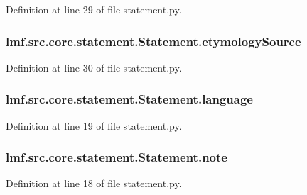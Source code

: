 Definition at line 29 of file statement.\+py.

\hypertarget{classlmf_1_1src_1_1core_1_1statement_1_1_statement_adeefdc77c6ff898b8adba4ef2a946af3}{
\subsubsection[{etymology\+Source}]{\setlength{\rightskip}{0pt plus 5cm}lmf.\+src.\+core.\+statement.\+Statement.\+etymology\+Source}}\label{classlmf_1_1src_1_1core_1_1statement_1_1_statement_adeefdc77c6ff898b8adba4ef2a946af3}


Definition at line 30 of file statement.\+py.

\hypertarget{classlmf_1_1src_1_1core_1_1statement_1_1_statement_a71a5b6eaf4bad349ab3399fbea06b88d}{
\subsubsection[{language}]{\setlength{\rightskip}{0pt plus 5cm}lmf.\+src.\+core.\+statement.\+Statement.\+language}}\label{classlmf_1_1src_1_1core_1_1statement_1_1_statement_a71a5b6eaf4bad349ab3399fbea06b88d}


Definition at line 19 of file statement.\+py.

\hypertarget{classlmf_1_1src_1_1core_1_1statement_1_1_statement_a231fe52b0b7ba3deb6d0993987dddaf0}{
\subsubsection[{note}]{\setlength{\rightskip}{0pt plus 5cm}lmf.\+src.\+core.\+statement.\+Statement.\+note}}\label{classlmf_1_1src_1_1core_1_1statement_1_1_statement_a231fe52b0b7ba3deb6d0993987dddaf0}


Definition at line 18 of file statement.\+py.

